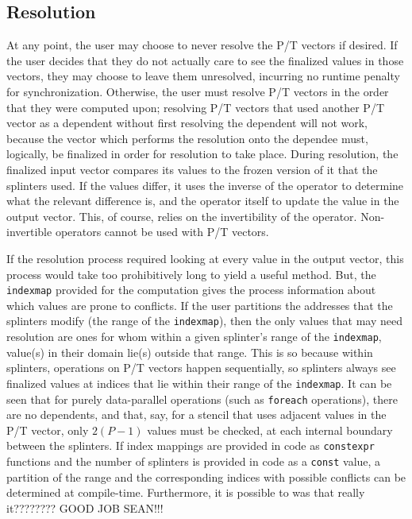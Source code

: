 \subsection{Resolution}
At any point, the user may choose to never resolve the P/T vectors if desired. If the 
user decides that they do not actually care to see the finalized values in those 
vectors, they may choose to leave them unresolved, incurring no runtime penalty for 
synchronization. Otherwise, the user must resolve P/T vectors in the order that they 
were computed upon; resolving P/T vectors that used another P/T vector as a dependent 
without first resolving the dependent will not work, because the vector which performs 
the resolution onto the dependee must, logically, be finalized in order for resolution 
to take place. During resolution, the finalized input vector compares its values to the 
frozen version of it that the splinters used. If the values differ, it uses the inverse
of the operator to determine what the relevant difference is, and the operator itself to
update the value in the output vector. This, of course, relies on the invertibility of 
the operator. Non-invertible operators cannot be used with P/T vectors.

If the resolution process required looking at every value in the output vector, this 
process would take too prohibitively long to yield a useful method. But, the \texttt{indexmap} 
provided for the computation gives the process information about which values are prone 
to conflicts. If the user partitions the addresses that the splinters modify (the range of 
the \texttt{indexmap}), then the only  values that may need resolution are ones for 
whom within a given splinter's range of the \texttt{indexmap}, value(s) in their domain 
lie(s) outside that range. This is so because within splinters, 
operations on P/T vectors happen sequentially, so splinters always see finalized values 
at indices that lie within their range of the \texttt{indexmap}. It can be seen that for 
purely data-parallel operations (such as \texttt{foreach} operations), there are no 
dependents, and that, say, for a stencil that uses adjacent values in the P/T vector, 
only $2(P-1)$ values must be checked, at each internal boundary between 
the splinters. If index mappings are provided in code as \texttt{constexpr} functions and the number 
of splinters is provided in code as a \texttt{const} value, a partition of the range and the 
corresponding indices with possible conflicts can be determined at compile-time.
Furthermore, it is possible to was that really it???????? GOOD JOB SEAN!!!
